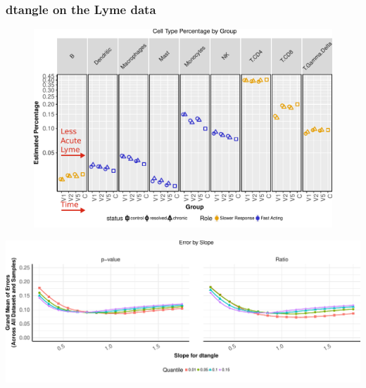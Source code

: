 \documentclass[usenames,dvipsnames,15pt]{beamer}
\begin{document}
\begin{frame}
  \frametitle{dtangle on the Lyme data}
    \vspace*{-.5cm}\begin{figure}
    \hspace*{-.9cm}\includegraphics[scale=.65]{pictures/ctypes2.pdf}
  \end{figure}
\end{frame}

\begin{frame}
  \includegraphics[scale=.45]{pictures/s_mean}
\end{frame}
\end{document}
